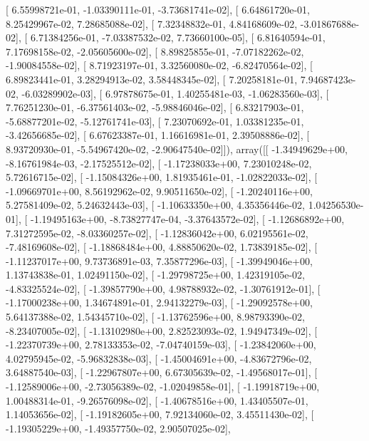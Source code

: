 \documentclass{article}
\begin{document}
       [  6.55998721e-01,  -1.03390111e-01,  -3.73681741e-02],
       [  6.64861720e-01,   8.25429967e-02,   7.28685088e-02],
       [  7.32348832e-01,   4.84168609e-02,  -3.01867688e-02],
       [  6.71384256e-01,  -7.03387532e-02,   7.73660100e-05],
       [  6.81640594e-01,   7.17698158e-02,  -2.05605600e-02],
       [  8.89825855e-01,  -7.07182262e-02,  -1.90084558e-02],
       [  8.71923197e-01,   3.32560080e-02,  -6.82470564e-02],
       [  6.89823441e-01,   3.28294913e-02,   3.58448345e-02],
       [  7.20258181e-01,   7.94687423e-02,  -6.03289902e-03],
       [  6.97878675e-01,   1.40255481e-03,  -1.06283560e-03],
       [  7.76251230e-01,  -6.37561403e-02,  -5.98846046e-02],
       [  6.83217903e-01,  -5.68877201e-02,  -5.12761741e-03],
       [  7.23070692e-01,   1.03381235e-01,  -3.42656685e-02],
       [  6.67623387e-01,   1.16616981e-01,   2.39508886e-02],
       [  8.93720930e-01,  -5.54967420e-02,  -2.90647540e-02]]), array([[ -1.34949629e+00,  -8.16761984e-03,  -2.17525512e-02],
       [ -1.17238033e+00,   7.23010248e-02,   5.72616715e-02],
       [ -1.15084326e+00,   1.81935461e-01,  -1.02822033e-02],
       [ -1.09669701e+00,   8.56192962e-02,   9.90511650e-02],
       [ -1.20240116e+00,   5.27581409e-02,   5.24632443e-03],
       [ -1.10633350e+00,   4.35356446e-02,   1.04256530e-01],
       [ -1.19495163e+00,  -8.73827747e-04,  -3.37643572e-02],
       [ -1.12686892e+00,   7.31272595e-02,  -8.03360257e-02],
       [ -1.12836042e+00,   6.02195561e-02,  -7.48169608e-02],
       [ -1.18868484e+00,   4.88850620e-02,   1.73839185e-02],
       [ -1.11237017e+00,   9.73736891e-03,   7.35877296e-03],
       [ -1.39949046e+00,   1.13743838e-01,   1.02491150e-02],
       [ -1.29798725e+00,   1.42319105e-02,  -4.83325524e-02],
       [ -1.39857790e+00,   4.98788932e-02,  -1.30761912e-01],
       [ -1.17000238e+00,   1.34674891e-01,   2.94132279e-03],
       [ -1.29092578e+00,   5.64137388e-02,   1.54345710e-02],
       [ -1.13762596e+00,   8.98793390e-02,  -8.23407005e-02],
       [ -1.13102980e+00,   2.82523093e-02,   1.94947349e-02],
       [ -1.22370739e+00,   2.78133353e-02,  -7.04740159e-03],
       [ -1.23842060e+00,   4.02795945e-02,  -5.96832838e-03],
       [ -1.45004691e+00,  -4.83672796e-02,   3.64887540e-03],
       [ -1.22967807e+00,   6.67305639e-02,  -1.49568017e-01],
       [ -1.12589006e+00,  -2.73056389e-02,  -1.02049858e-01],
       [ -1.19918719e+00,   1.00488314e-01,  -9.26576098e-02],
       [ -1.40678516e+00,   1.43405507e-01,   1.14053656e-02],
       [ -1.19182605e+00,   7.92134060e-02,   3.45511430e-02],
       [ -1.19305229e+00,  -1.49357750e-02,   2.90507025e-02],
\end{document}
